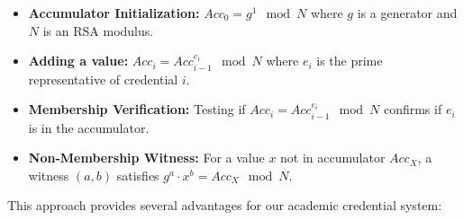 \documentclass[lettersize,journal]{IEEEtran}
\begin{document}
\begin{itemize}
    \item \textbf{Accumulator Initialization:} $Acc_0 = g^{1} \mod N$ where $g$ is a generator and $N$ is an RSA modulus.
    
    \item \textbf{Adding a value:} $Acc_i = Acc_{i-1}^{e_i} \mod N$ where $e_i$ is the prime representative of credential $i$.
    
    \item \textbf{Membership Verification:} Testing if $Acc_i = Acc_{i-1}^{e_i} \mod N$ confirms if $e_i$ is in the accumulator.
    
    \item \textbf{Non-Membership Witness:} For a value $x$ not in accumulator $Acc_X$, a witness $(a, b)$ satisfies $g^a \cdot x^b = Acc_X \mod N$.
\end{itemize}

This approach provides several advantages for our academic credential system:
\end{document}
